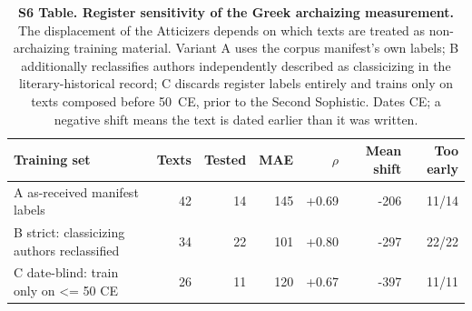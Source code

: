 \begin{table}[!ht]
\centering
\footnotesize
\caption{{\bf S6 Table. Register sensitivity of the Greek archaizing measurement.}  The displacement of the Atticizers depends on which texts are treated as non-archaizing training material.  Variant A uses the corpus manifest's own labels; B additionally reclassifies authors independently described as classicizing in the literary-historical record; C discards register labels entirely and trains only on texts composed before 50~CE, prior to the Second Sophistic.  Dates CE; a negative shift means the text is dated earlier than it was written.}
\label{tab:s6}
\begin{tabular}{lrrrrrr}
\toprule
\textbf{Training set} & \textbf{Texts} & \textbf{Tested} & \textbf{MAE} & \textbf{$\rho$} & \textbf{Mean shift} & \textbf{Too early} \\
\midrule
A  as-received manifest labels & 42 & 14 & 145 & +0.69 & -206 & 11/14 \\
B  strict: classicizing authors reclassified & 34 & 22 & 101 & +0.80 & -297 & 22/22 \\
C  date-blind: train only on <= 50 CE & 26 & 11 & 120 & +0.67 & -397 & 11/11 \\
\bottomrule
\end{tabular}
\end{table}
